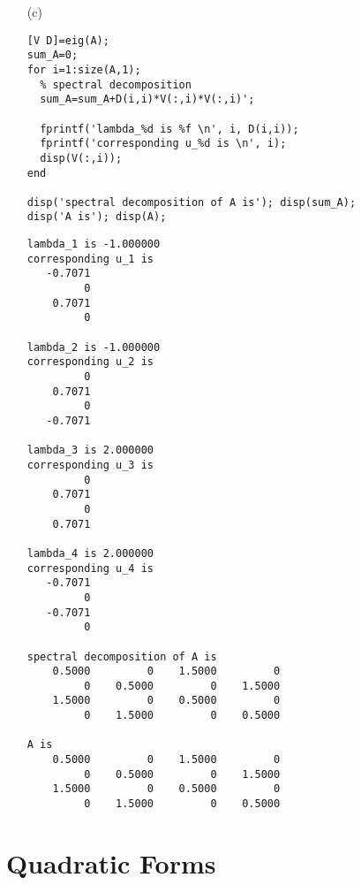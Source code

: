 \begin{exer}
\begin{sol}
\begin{enumerate}
\item[(c)]
\begin{verbatim}
[V D]=eig(A);
sum_A=0;
for i=1:size(A,1);
  % spectral decomposition
  sum_A=sum_A+D(i,i)*V(:,i)*V(:,i)'; 

  fprintf('lambda_%d is %f \n', i, D(i,i));
  fprintf('corresponding u_%d is \n', i);
  disp(V(:,i));
end

disp('spectral decomposition of A is'); disp(sum_A);
disp('A is'); disp(A);
\end{verbatim}


\begin{outputs}

\begin{verbatim}
lambda_1 is -1.000000
corresponding u_1 is
   -0.7071
         0
    0.7071
         0

lambda_2 is -1.000000
corresponding u_2 is
         0
    0.7071
         0
   -0.7071

lambda_3 is 2.000000
corresponding u_3 is
         0
    0.7071
         0
    0.7071

lambda_4 is 2.000000
corresponding u_4 is
   -0.7071
         0
   -0.7071
         0

spectral decomposition of A is
    0.5000         0    1.5000         0
         0    0.5000         0    1.5000
    1.5000         0    0.5000         0
         0    1.5000         0    0.5000

A is
    0.5000         0    1.5000         0
         0    0.5000         0    1.5000
    1.5000         0    0.5000         0
         0    1.5000         0    0.5000
\end{verbatim}
\end{outputs}
\end{enumerate}
\end{sol}


\end{exer}











\section{Quadratic Forms}


